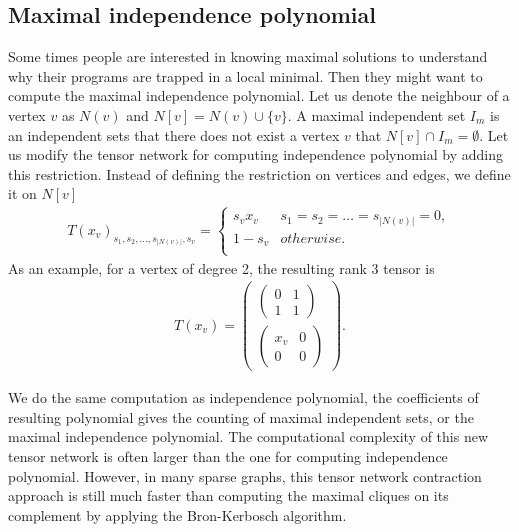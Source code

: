 \documentclass[review,onefignum,onetabnum]{siamart190516}
\newcommand{\<}{\langle}
\renewcommand{\>}{\rangle}
\newcounter{example}
\begin{document}
\subsection{Maximal independence polynomial}
Some times people are interested in knowing maximal solutions to understand why their programs are trapped in a local minimal.
Then they might want to compute the maximal independence polynomial.
Let us denote the neighbour of a vertex $v$ as $N(v)$ and $N[v] = N(v)\cup \{v\}$.
A maximal independent set $I_m$ is an independent sets that there does not exist a vertex $v$ that $N[v] \cap I_m = \emptyset$.
Let us modify the tensor network for computing independence polynomial by adding this restriction.
Instead of defining the restriction on vertices and edges, we define it on $N[v]$
\begin{align}
    T(x_v)_{s_1,s_2,\ldots,s_{|N(v)|},s_v} = \begin{cases}
        s_vx_v & s_1=s_2=\ldots=s_{|N(v)|}=0,\\
        1-s_v& otherwise.\\
    \end{cases}
\end{align}
As an example, for a vertex of degree 2, the resulting rank 3 tensor is
\begin{align}
    T(x_v)=\left(\begin{matrix}
    \left(\begin{matrix}
        0 &1 \\
        1 &1
    \end{matrix}\right)\\
    \left(\begin{matrix}
        x_v &0 \\
        0 &0
    \end{matrix}\right)
    \end{matrix}\right).
\end{align}

We do the same computation as independence polynomial, the coefficients of resulting polynomial gives the counting of maximal independent sets, or the maximal independence polynomial.
The computational complexity of this new tensor network is often larger than the one for computing independence polynomial.
However, in many sparse graphs, this tensor network contraction approach is still much faster than computing the maximal cliques on its complement by applying the Bron-Kerbosch algorithm.
\end{document}
